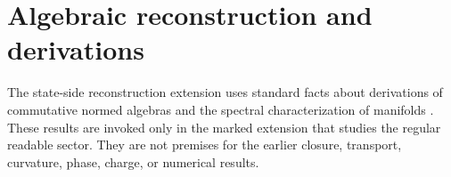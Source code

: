 \section{Algebraic reconstruction and derivations}
\label{app:standard-algebraic-reconstruction}
The state-side reconstruction extension uses standard facts about
derivations of commutative normed algebras and the spectral
characterization of manifolds \cite{SingerWermer1955,Connes2013}.  These
results are invoked only in the marked extension that studies the
regular readable sector.  They are not premises for the earlier closure,
transport, curvature, phase, charge, or numerical results.

\begin{chapterclosing}
\end{chapterclosing}
